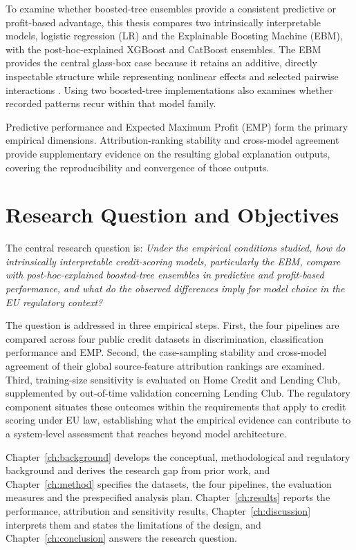 To examine whether boosted-tree ensembles provide a consistent predictive or
profit-based advantage, this thesis compares two intrinsically interpretable models,
logistic regression (LR) and the Explainable Boosting Machine (EBM), with the
post-hoc-explained XGBoost and CatBoost ensembles. The EBM provides the central
glass-box case because it retains an additive, directly inspectable structure while
representing nonlinear effects and selected pairwise interactions
\citep{louAccurateIntelligibleModels2013,
noriInterpretMLUnifiedFramework2019}. Using two boosted-tree implementations also
examines whether recorded patterns recur within that model family.

Predictive performance and Expected Maximum Profit (EMP)
\citep{verbrakenDevelopmentApplicationConsumer2014} form the primary empirical
dimensions. Attribution-ranking stability and cross-model agreement provide supplementary
evidence on the resulting global explanation outputs, covering the reproducibility
and convergence of those outputs.

\section{Research Question and Objectives}\label{sec:rq}

The central research question is: \textit{Under the empirical conditions studied,
how do intrinsically interpretable credit-scoring models, particularly the EBM,
compare with post-hoc-explained boosted-tree ensembles in predictive and profit-based
performance, and what do the observed differences imply for model choice in the EU
regulatory context?}

The question is addressed in three empirical steps. First, the four pipelines are
compared across four public credit datasets in discrimination, classification performance and EMP. Second, the case-sampling stability
and cross-model agreement of their global source-feature attribution rankings are
examined. Third, training-size sensitivity is evaluated on Home Credit and Lending
Club, supplemented by out-of-time validation concerning Lending Club. The regulatory component situates these outcomes within the requirements that apply
to credit scoring under EU law, establishing what the empirical evidence can
contribute to a system-level assessment that reaches beyond model architecture. 

Chapter~\ref{ch:background} develops the conceptual, methodological and regulatory
background and derives the research gap from prior work, and
Chapter~\ref{ch:method} specifies the datasets, the four pipelines, the evaluation
measures and the prespecified analysis plan. Chapter~\ref{ch:results} reports the
performance, attribution and sensitivity results, Chapter~\ref{ch:discussion}
interprets them and states the limitations of the design, and
Chapter~\ref{ch:conclusion} answers the research question.
